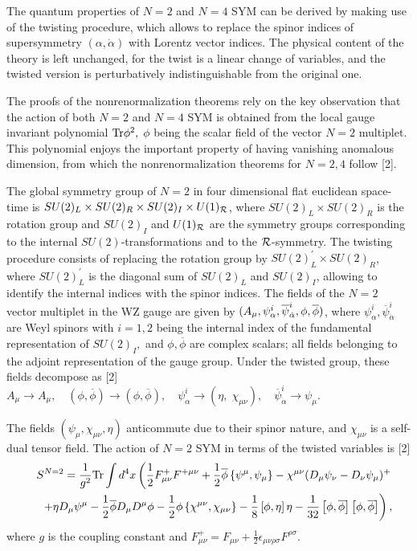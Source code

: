 \documentclass[a4paper,a4paper]{article}
\begin{document}
The quantum properties of $N=2$ and $N=4$ SYM can be derived by making use 
of the twisting procedure, which allows to replace the spinor
indices of supersymmetry $(\alpha ,\dot{\alpha})$ with Lorentz vector
indices. The physical content of the theory is left
unchanged, for the twist is a linear change of variables, and the twisted
version is perturbatively indistinguishable from the original one. 

The proofs of the nonrenormalization theorems rely on the key
observation that the action of both $N=2$ and $N=4$ SYM is obtained from the
local gauge invariant polynomial ${\rm Tr}\phi ^2,$ $\phi $ being the scalar
field of the vector $N=2$ multiplet. This polynomial enjoys the important
property of having vanishing anomalous dimension, from which the 
nonrenormalization theorems for $N=2,4$ follow [2].

The global symmetry group of $N=2$
in four dimensional flat euclidean space-time is $SU(2)_L\times
SU(2)_R\times SU(2)_I\times U(1)_{{\cal R}}$, where $SU(2)_L\times SU(2)_R$
is the rotation group and $SU(2)_I$ and $U(1)_{{\cal R}}$ are the symmetry
groups corresponding to the internal $SU(2)$-transformations and to
the ${\cal R}$-symmetry. The twisting procedure consists of replacing the
rotation group by $SU(2)_L^{\prime }\times SU(2)_R$, where $SU(2)_L^{\prime }$ 
is the diagonal sum of $SU(2)_L$ and $SU(2)_I$, allowing to identify the
internal indices with the spinor indices. The fields of the $N=2$ vector
multiplet in the WZ gauge are given by $(A_\mu ,\psi _\alpha ^i,\overline{%
\psi }_{\dot{\alpha}}^i,\phi ,\overline{\phi })$, where $\psi _\alpha ^i,%
\overline{\psi }_{\dot{\alpha}}^i$ are Weyl spinors with $i=1,2$ being the
internal index of the fundamental representation of $SU(2)_I,$ and $\phi ,%
\overline{\phi }$ are complex scalars; all fields belonging to the adjoint
representation of the gauge group. Under the twisted group, these fields
decompose as [2] $ A_\mu \rightarrow A_\mu , \,\,\,\,\,\,
(\phi, \overline{\phi}) \rightarrow (\phi, \overline{\phi}) , \,\,\,\,\,\,
\psi^{i}_{\alpha}  \rightarrow   (\eta,\;\chi_{\mu \nu}) , \,\,\,\,\,\,
\overline{\psi}^{i}_{\dot{\alpha}} \rightarrow \psi_{\mu} $.

The fields $(\psi _\mu ,\chi _{\mu \nu },\eta )$ anticommute due to their
spinor nature, and $\chi _{\mu \nu }$ is a self-dual tensor field. The
action of $N=2$ SYM in terms of the twisted variables is [2] 
\begin{eqnarray}
&&S^{N=2} = \frac 1{g^2}{\rm Tr}\int d^4x\left( \frac 12F_{\mu \nu
}^{+}F^{+\mu \nu }+\frac 12\overline{\phi }\left\{ \psi ^\mu ,\psi _\mu
\right\} -\chi ^{\mu \nu }(D_\mu \psi _\nu -D_\nu \psi _\mu )^{+}\right.  
\nonumber \\
&&\left. \hspace{2mm}+\eta D_\mu \psi ^\mu -\frac 12\overline{\phi }D_\mu D^\mu \phi
-\frac 12\phi \left\{ \chi ^{\mu \nu },\chi _{\mu \nu }\right\} -\frac
18\left[ \phi ,\eta \right] \eta -\frac 1{32}\left[ \phi ,\overline{\phi }%
\right] \left[ \phi ,\overline{\phi }\right] \right) ,  \nonumber
\end{eqnarray}
where $g$ is the coupling constant and $F_{\mu \nu }^{+}=F_{\mu \nu }+\frac 12\epsilon _{\mu \nu \rho \sigma}F^{\rho \sigma }$.
\end{document}

